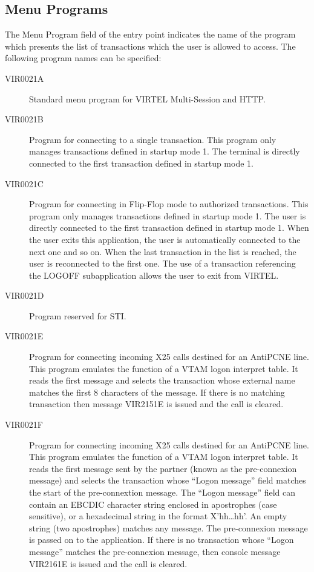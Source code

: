 \documentclass[letterpaper,10pt,english]{sphinxmanual}
\begin{document}

\subsection{Menu Programs}
\label{\detokenize{connectivity_guide:menu-programs}}\label{\detokenize{connectivity_guide:index-111}}
The Menu Program field of the entry point indicates the name of the program which presents the list of transactions which the user is allowed to access. The following program names can be specified:
\begin{description}
\item[{VIR0021A}] \leavevmode
Standard menu program for VIRTEL Multi-Session and HTTP.

\item[{VIR0021B}] \leavevmode
Program for connecting to a single transaction. This program only manages transactions defined in startup mode 1. The terminal is directly connected to the first transaction defined in startup mode 1.

\item[{VIR0021C}] \leavevmode
Program for connecting in Flip-Flop mode to authorized transactions. This program only manages transactions defined in startup mode 1. The user is directly connected to the first transaction defined in startup mode 1. When the user exits this application, the user is automatically connected to the next one and so on. When the last transaction in the list is reached, the user is reconnected to the first one. The use of a transaction referencing the LOGOFF subapplication allows the user to exit from VIRTEL.

\item[{VIR0021D}] \leavevmode
Program reserved for STI.

\item[{VIR0021E}] \leavevmode
Program for connecting incoming X25 calls destined for an AntiPCNE line. This program emulates the function of a VTAM logon interpret table. It reads the first message and selects the transaction whose external name matches the first 8 characters of the message. If there is no matching transaction then message VIR2151E is issued and the call is cleared.

\item[{VIR0021F}] \leavevmode
Program for connecting incoming X25 calls destined for an AntiPCNE line. This program emulates the function of a VTAM logon interpret table. It reads the first message sent by the partner (known as the pre-connexion message) and selects the transaction whose “Logon message” field matches the start of the pre-connextion message. The “Logon message” field can contain an EBCDIC character string enclosed in apostrophes (case sensitive), or a hexadecimal string in the format X’hh…hh’. An empty string (two apostrophes) matches any message. The pre-connexion message is passed on to the application. If there is no transaction whose “Logon message” matches the pre-connexion message, then console message VIR2161E is issued and the call is cleared.


\end{description}
\end{document}
